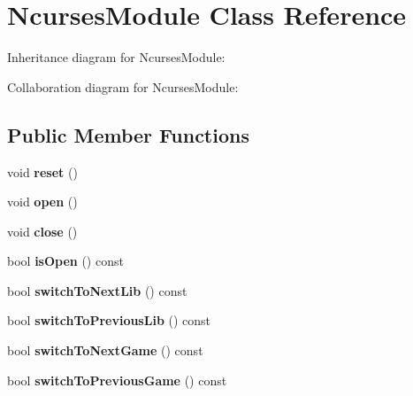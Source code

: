 \hypertarget{class_ncurses_module}{}\section{Ncurses\+Module Class Reference}
\label{class_ncurses_module}


Inheritance diagram for Ncurses\+Module\+:


Collaboration diagram for Ncurses\+Module\+:
\subsection*{Public Member Functions}
\begin{DoxyCompactItemize}
\item 
\mbox{\label{class_ncurses_module_ad247663fca36b1a737ff8f8756dd4a5a}} 
void {\bfseries reset} ()
\item 
\mbox{\label{class_ncurses_module_a2f8ae185d035d4629d6beaabe02ec137}} 
void {\bfseries open} ()
\item 
\mbox{\label{class_ncurses_module_a5a2d2da5c841d114f2f4dff4dad8ab08}} 
void {\bfseries close} ()
\item 
\mbox{\label{class_ncurses_module_a480243cfaaac74441d51902732e4a31a}} 
bool {\bfseries is\+Open} () const
\item 
\mbox{\label{class_ncurses_module_ad2d24ea059e6abdf408ff36c0c060391}} 
bool {\bfseries switch\+To\+Next\+Lib} () const
\item 
\mbox{\label{class_ncurses_module_a9d551b125a4bc330438c9bee7748acaf}} 
bool {\bfseries switch\+To\+Previous\+Lib} () const
\item 
\mbox{\label{class_ncurses_module_a73173869b573e7d86ffc42104cbb6e30}} 
bool {\bfseries switch\+To\+Next\+Game} () const
\item 
\mbox{\label{class_ncurses_module_a1a46597b8fb2ee90d5edc0312cf4d827}} 
bool {\bfseries switch\+To\+Previous\+Game} () const
\item 

\end{DoxyCompactItemize}
